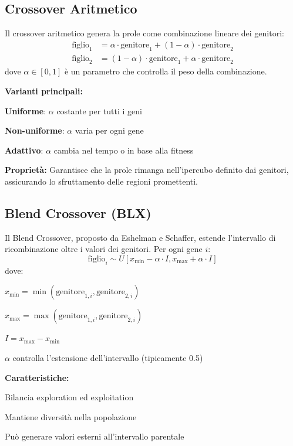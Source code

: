 \subsection{Crossover Aritmetico}
Il crossover aritmetico genera la prole come combinazione lineare dei genitori:
\[
\begin{aligned}
\text{figlio}_1 &= \alpha \cdot \text{genitore}_1 + (1-\alpha) \cdot \text{genitore}_2 \\
\text{figlio}_2 &= (1-\alpha) \cdot \text{genitore}_1 + \alpha \cdot \text{genitore}_2
\end{aligned}
\]
dove $\alpha \in [0,1]$ è un parametro che controlla il peso della combinazione.

\textbf{Varianti principali:}
\begin{compactitemize}
\item \textbf{Uniforme}: $\alpha$ costante per tutti i geni
\item \textbf{Non-uniforme}: $\alpha$ varia per ogni gene
\item \textbf{Adattivo}: $\alpha$ cambia nel tempo o in base alla fitness
\end{compactitemize}

\textbf{Proprietà:} Garantisce che la prole rimanga nell'ipercubo definito dai genitori, assicurando lo sfruttamento delle regioni promettenti.

\subsection{Blend Crossover (BLX)}
Il Blend Crossover, proposto da Eshelman e Schaffer, estende l'intervallo di ricombinazione oltre i valori dei genitori. Per ogni gene $i$:
\[
\text{figlio}_i \sim U[x_{\min} - \alpha \cdot I, x_{\max} + \alpha \cdot I]
\]
dove:
\begin{compactitemize}
\item $x_{\min} = \min(\text{genitore}_{1,i}, \text{genitore}_{2,i})$
\item $x_{\max} = \max(\text{genitore}_{1,i}, \text{genitore}_{2,i})$
\item $I = x_{\max} - x_{\min}$
\item $\alpha$ controlla l'estensione dell'intervallo (tipicamente 0.5)
\end{compactitemize}

\textbf{Caratteristiche:}
\begin{compactitemize}
\item Bilancia exploration ed exploitation
\item Mantiene diversità nella popolazione
\item Può generare valori esterni all'intervallo parentale
\end{compactitemize}

